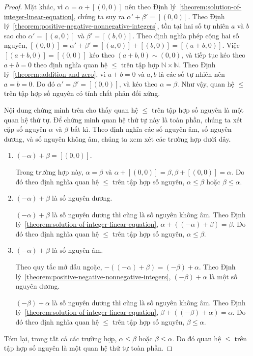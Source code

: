 \begin{proof}
    Mặt khác, vì $\alpha = \alpha + [(0,0)]$ nên theo Định lý~\ref{theorem:solution-of-integer-linear-equation}, chúng ta suy ra $\alpha' + \beta' = [(0,0)]$. Theo Định lý~\ref{theorem:positive-negative-nonnegative-integers}, tồn tại hai số tự nhiên $a$ và $b$ sao cho $\alpha' = [(a, 0)]$ và $\beta' = [(b, 0)]$. Theo định nghĩa phép cộng hai số nguyên, $[(0, 0)] = \alpha' + \beta' = [(a, 0)] + [(b, 0)] = [(a+b, 0)]$. Việc $[(a+b, 0)] = [(0,0)]$ kéo theo $(a+b, 0)\sim (0,0)$, và tiếp tục kéo theo $a + b = 0$ theo định nghĩa quan hệ $\leq$ trên tập hợp $\mathbb{N}\times\mathbb{N}$. Theo Định lý~\ref{theorem:addition-and-zero}, vì $a + b = 0$ và $a, b$ là các số tự nhiên nên $a = b = 0$. Do đó $\alpha' = \beta' = [(0, 0)]$, và kéo theo $\alpha = \beta$. Như vậy, quan hệ $\leq$ trên tập hợp số nguyên có tính chất phản đối xứng.

    Nội dung chứng minh trên cho thấy quan hệ $\leq$ trên tập hợp số nguyên là một quan hệ thứ tự. Để chứng minh quan hệ thứ tự này là toàn phần, chúng ta xét cặp số nguyên $\alpha$ và $\beta$ bất kì. Theo định nghĩa các số nguyên âm, số nguyên dương, và số nguyên không âm, chúng ta xem xét các trường hợp dưới đây.
    \begin{enumerate}[label={\textbf{Trường hợp \arabic*.}},itemindent=2cm]
        \item $(-\alpha) + \beta = [(0,0)]$.

              Trong trường hợp này, $\alpha = \beta$ và $\alpha + [(0,0)] = \beta, \beta + [(0, 0)] = \alpha$. Do đó theo định nghĩa quan hệ $\leq$ trên tập hợp số nguyên, $\alpha\leq\beta$ hoặc $\beta\leq\alpha$.
        \item $(-\alpha) + \beta $ là số nguyên dương.

              $(-\alpha) + \beta $ là số nguyên dương thì cũng là số nguyên không âm. Theo Định lý~\ref{theorem:solution-of-integer-linear-equation}, $\alpha + ((-\alpha) + \beta) = \beta$. Do đó theo định nghĩa quan hệ $\leq$ trên tập hợp số nguyên, $\alpha\leq\beta$.
        \item $(-\alpha) + \beta $ là số nguyên âm.

              Theo quy tắc mở dấu ngoặc, $-((-\alpha) + \beta) = (-\beta) + \alpha$. Theo Định lý~\ref{theorem:positive-negative-nonnegative-integers}, $(-\beta) + \alpha$ là một số nguyên dương.

              $(-\beta) + \alpha$ là số nguyên dương thì cũng là số nguyên không âm. Theo Định lý~\ref{theorem:solution-of-integer-linear-equation}, $\beta + ((-\beta) + \alpha) = \alpha$. Do đó theo định nghĩa quan hệ $\leq$ trên tập hợp số nguyên, $\beta\leq\alpha$.
    \end{enumerate}

    Tóm lại, trong tất cả các trường hợp, $\alpha\leq\beta$ hoặc $\beta\leq\alpha$. Do đó quan hệ $\leq$ trên tập hợp số nguyên là một quan hệ thứ tự toàn phần.
\end{proof}

